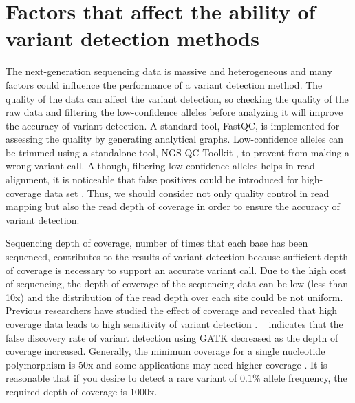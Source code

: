 \documentclass[11pt,reqno]{amsart}
\begin{document}
\section{Factors that affect the ability of variant detection methods}
The next-generation sequencing data is massive and heterogeneous and many factors could influence the performance of a variant detection method.
The quality of the data can affect the variant detection, so checking the quality of the raw data and filtering the low-confidence alleles before analyzing it will improve the accuracy of variant detection.
A standard tool, FastQC, is implemented for assessing the quality by generating analytical graphs.
Low-confidence alleles can be trimmed using a standalone tool, NGS QC Toolkit \citep{patel2012ngs}, to prevent from making a wrong variant call.
Although, filtering low-confidence alleles helps in read alignment, it is noticeable that false positives could be introduced for high-coverage data set \citep{liu2012steps}.
Thus, we should consider not only quality control in read mapping but also the read depth of coverage in order to ensure the accuracy of variant detection.

Sequencing depth of coverage, number of times that each base has been sequenced, contributes to the results of variant detection because sufficient depth of coverage is necessary to support an accurate variant call.
Due to the high cost of sequencing, the depth of coverage of the sequencing data can be low (less than 10x) and the distribution of the read depth over each site could be not uniform.
Previous researchers have studied the effect of coverage and revealed that high coverage data leads to high sensitivity of variant detection \citep{neuman2013analysis, krawitz2010microindel}.
~\citet{liu2013variant} indicates that the false discovery rate of variant detection using GATK decreased as the depth of coverage increased. 
Generally, the minimum coverage for a single nucleotide polymorphism is 50x and some applications may need higher coverage \citep{Schlotterer2014}.
It is reasonable that if you desire to detect a rare variant of $0.1 \%$ allele frequency, the required depth of coverage is 1000x.
\end{document}
